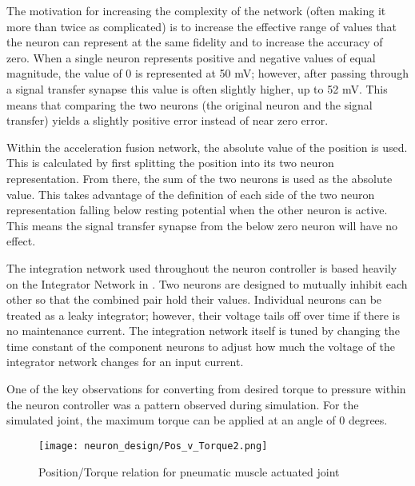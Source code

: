 The motivation for increasing the complexity of the
network (often making it more than twice as complicated) is to increase the
effective range of values that the neuron can represent at the same fidelity and
to increase the accuracy of zero. When a single neuron represents positive and
negative values of equal magnitude, the value of 0 is represented at 50 mV; 
however, after passing through a signal transfer synapse this value is often
slightly higher, up to 52 mV. This means that comparing the two neurons (the
original neuron and the signal transfer) yields a slightly positive error
instead of near zero error.



Within the acceleration fusion network, the absolute value of the position is
used. This is calculated by first splitting the position into its two neuron
representation. From there, the sum of the two neurons is used as the absolute
value. This takes advantage of the definition of each side of the two neuron
representation falling below resting potential when the other neuron is active.
This means the signal transfer synapse from the below zero neuron will have no
effect.


The integration network used throughout the neuron controller is based heavily
on the Integrator Network in \cite{NickFunctionalSubnetwork}. Two neurons are
designed to mutually inhibit each other so that the combined pair hold their
values. Individual neurons can be treated as a leaky integrator; however, their
voltage tails off over time if there is no maintenance current. The integration
network itself is tuned by changing the time constant of the component neurons
to adjust how much the voltage of the integrator network changes for an input
current.


One of the key observations for converting from desired torque to pressure 
within the neuron controller was a pattern observed during simulation. For the
simulated joint, the maximum torque can be applied at an angle of 0 degrees.

\begin{figure}
\centering
\texttt{[image: neuron\_design/Pos\_v\_Torque2.png]}
\caption{Position/Torque relation for pneumatic muscle actuated joint}
\label{fig:PositionTorque}
\end{figure}

